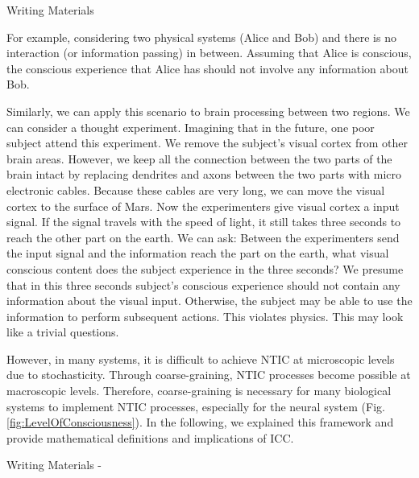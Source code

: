\documentclass[utf8]{article}
\newenvironment{WritingMaterials} %
    	{
            \begin{tcolorbox}[enhanced,
                title=-,
                size=small,
                colbacktitle=Aquamarine,
                drop fuzzy shadow,
                fontupper=\small,
                boxrule=0.4pt,
                colback=Aquamarine!10!white,
                sharp corners]
                Writing Materials
            \end{tcolorbox}
            \begin{easylist}[itemize]
    	}
    	{
            \end{easylist}  
            \begin{tcolorbox}[enhanced,
                halign=flush right,
                halign title=right,
                size=small,
                colbacktitle=Aquamarine,
                drop fuzzy shadow,
                fontupper=\small,
                boxrule=0.4pt,
                colback=Aquamarine,
                colupper=White,
                sharp corners]
                Writing Materials -
            \end{tcolorbox}        
    	}
\begin{document}
        \begin{WritingMaterials}
        For example, considering two physical systems (Alice and Bob) and there is no interaction (or information passing) in between. Assuming that Alice is conscious, the conscious experience that Alice has should not involve any information about Bob. 
        
        Similarly, we can apply this scenario to brain processing between two regions. We can consider a thought experiment. 
        Imagining that in the future, one poor subject attend this experiment. We remove the subject's visual cortex from other brain areas. However, we keep all the connection between the two parts of the brain intact by replacing dendrites and axons between the two parts with micro electronic cables. Because these cables are very long, we can move the visual cortex to the surface of Mars. Now the experimenters give visual cortex a input signal. If the signal travels with the speed of light, it still takes three seconds to reach the other part on the earth. We can ask: Between the experimenters send the input signal and the information reach the part on the earth, what visual conscious content does the subject experience in the three seconds? We presume that in this three seconds subject's conscious experience should not contain any information about the visual input. Otherwise, the subject may be able to use the information to perform subsequent actions. This violates physics. This may look like a trivial questions.
        

        However, in many systems, it is difficult to achieve NTIC at microscopic levels due to stochasticity. Through coarse-graining, NTIC processes become possible at macroscopic levels. Therefore, coarse-graining is necessary for many biological systems to implement NTIC processes, especially for the neural system (Fig. \ref{fig:LevelOfConsciousness}). In the following, we explained this framework and provide mathematical definitions and implications of ICC.  
        \end{WritingMaterials}
        
\end{document}
